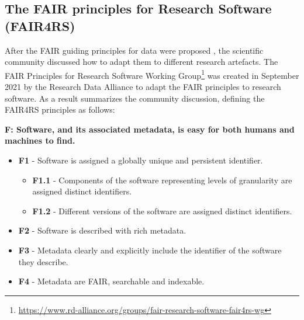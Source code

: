 
\subsection{The FAIR principles for Research Software (FAIR4RS)}
\label{subsec:fair4rs}


After the FAIR guiding principles for data were proposed \cite{wilkinson_fair_2016}, the scientific community discussed how to adapt them to different research artefacts. The FAIR Principles for Research Software Working Group\footnote{\url{https://www.rd-alliance.org/groups/fair-research-software-fair4rs-wg}} was created in September 2021 by the Research Data Alliance to adapt the FAIR principles to research software. As a result \cite{chue_hong_neil_p_2022_6623556} summarizes the community discussion, defining the FAIR4RS principles as follows:


\textbf{F: Software, and its associated metadata, is easy for both humans and machines to find.}

\begin{itemize}
    \item \textbf{F1} - Software is assigned a globally unique and persistent identifier.
    \begin{itemize}
        \item \textbf{F1.1} - Components of the software representing levels of granularity are assigned distinct identifiers.
        \item \textbf{F1.2} - Different versions of the software are assigned distinct identifiers.
    \end{itemize}

    \item \textbf{F2} - Software is described with rich metadata.
    \item \textbf{F3} - Metadata clearly and explicitly include the identifier of the software they describe.
    \item \textbf{F4} - Metadata are FAIR, searchable and indexable.
\end{itemize}

